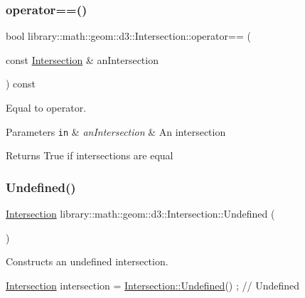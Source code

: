 \subsubsection{\texorpdfstring{operator==()}{operator==()}}
{\footnotesize\ttfamily bool library\+::math\+::geom\+::d3\+::\+Intersection\+::operator== (\begin{DoxyParamCaption}\item[{const \hyperlink{classlibrary_1_1math_1_1geom_1_1d3_1_1_intersection}{Intersection} \&}]{an\+Intersection }\end{DoxyParamCaption}) const}



Equal to operator. 


\begin{DoxyParams}[1]{Parameters}
\mbox{\tt in}  & {\em an\+Intersection} & An intersection \\
\hline
\end{DoxyParams}
\begin{DoxyReturn}{Returns}
True if intersections are equal 
\end{DoxyReturn}
\mbox{\label{classlibrary_1_1math_1_1geom_1_1d3_1_1_intersection_a6ce0af0ff5c24a4b56c264d2d3d6e59b}} 
\subsubsection{\texorpdfstring{Undefined()}{Undefined()}}
{\footnotesize\ttfamily \hyperlink{classlibrary_1_1math_1_1geom_1_1d3_1_1_intersection}{Intersection} library\+::math\+::geom\+::d3\+::\+Intersection\+::\+Undefined (\begin{DoxyParamCaption}{ }\end{DoxyParamCaption})\hspace{0.3cm}{\ttfamily [static]}}



Constructs an undefined intersection. 


\begin{DoxyCode}
\hyperlink{classlibrary_1_1math_1_1geom_1_1d3_1_1_intersection_ab800dbab95076a1d7ae47bd9d0887da3}{Intersection} intersection = \hyperlink{classlibrary_1_1math_1_1geom_1_1d3_1_1_intersection_a6ce0af0ff5c24a4b56c264d2d3d6e59b}{Intersection::Undefined}() ; \textcolor{comment}{// Undefined}
\end{DoxyCode}


